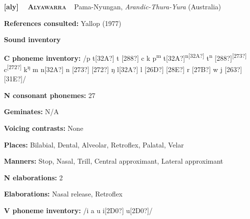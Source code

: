 \clearpage\begin{styleBody}
\textbf{[aly] }\ \ \textbf{\textsc{Alyawarra}}\textbf{\ \ }Pama-Nyungan, \textit{Arandic-Thura-Yura} (Australia)
\end{styleBody}

\begin{styleBody}
\textbf{References consulted: }Yallop (1977)
\end{styleBody}

\begin{styleBody}
\textbf{Sound inventory}
\end{styleBody}

\begin{styleBody}
\textbf{C phoneme inventory:} /p t[32A?] t [288?] c k p\textsuperscript{m} t[32A?]\textsuperscript{n[32A?]} t\textsuperscript{n} [288?]\textsuperscript{[273?]} c\textsuperscript{[272?]} k\textsuperscript{ŋ} m n[32A?] n [273?] [272?] ŋ l[32A?] l [26D?] [28E?] r [27B?] w j [263?][31E?]/
\end{styleBody}

\begin{styleBody}
\textbf{N consonant phonemes:} 27
\end{styleBody}

\begin{styleBody}
\textbf{Geminates:} N/A
\end{styleBody}

\begin{styleBody}
\textbf{Voicing contrasts: }None
\end{styleBody}

\begin{styleBody}
\textbf{Places:} Bilabial, Dental, Alveolar, Retroflex, Palatal, Velar
\end{styleBody}

\begin{styleBody}
\textbf{Manners:} Stop, Nasal, Trill, Central approximant, Lateral approximant
\end{styleBody}

\begin{styleBody}
\textbf{N elaborations:} 2
\end{styleBody}

\begin{styleBody}
\textbf{Elaborations:} Nasal release, Retroflex
\end{styleBody}

\begin{styleBody}
\textbf{V phoneme inventory:} /i a u i[2D0?] u[2D0?]/
\end{styleBody}

